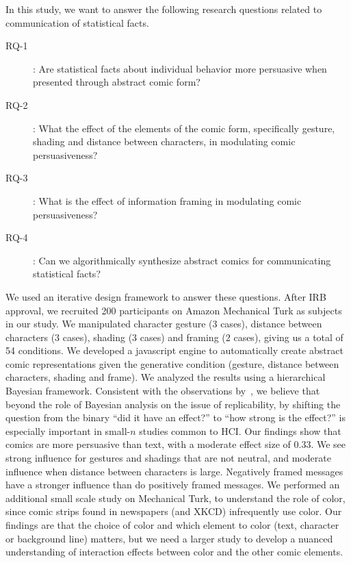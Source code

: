 

In this study, we want to answer the following research questions related to communication of statistical facts.

\begin{description}
 \item[RQ-1]: Are statistical facts about individual behavior more persuasive when presented through abstract comic form?
 \item [RQ-2]: What the effect of the elements of the comic form, specifically gesture, shading and distance between characters, in modulating comic persuasiveness?
 \item [RQ-3]: What is the effect of information framing in modulating comic persuasiveness?
 \item [RQ-4]: Can we algorithmically synthesize abstract comics for communicating statistical facts?
\end{description}

We used an iterative design framework to answer these questions. After IRB approval, we recruited 200 participants on Amazon Mechanical Turk as subjects in our study. We manipulated character gesture (3 cases), distance between characters (3 cases), shading (3 cases) and framing (2 cases), giving us a total of 54 conditions. We developed a javascript engine to automatically create abstract comic representations given the generative condition (gesture, distance between characters, shading and frame). We analyzed the results using a hierarchical Bayesian framework. Consistent with the observations by~\textcite{Kay2016}, we believe that beyond the role of Bayesian analysis on the issue of replicability, by shifting the question from the binary ``did it have an effect?'' to ``how strong is the effect?'' is especially important in small-$n$ studies common to HCI. Our findings show that comics are more persuasive than text, with a moderate effect size of 0.33. We see strong influence for gestures and shadings that are not neutral, and moderate influence when distance between characters is large. Negatively framed messages have a stronger influence than do positively framed messages. We performed an additional small scale study on Mechanical Turk, to understand the role of color, since comic strips found in newspapers (and XKCD) infrequently use color. Our findings are that the choice of color and which element to color (text, character or background line) matters, but we need a larger study to develop a nuanced understanding of interaction effects between color and the other comic elements.

